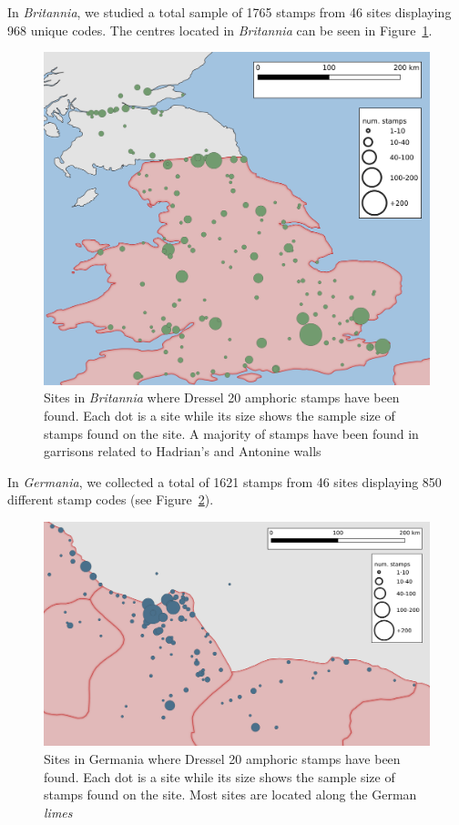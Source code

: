 In \textit{Britannia}, we studied a total sample of 1765 stamps from 46 sites displaying 968 unique codes. The centres located in \textit{Britannia} can be seen in Figure~\ref{britannia}.
 
\begin{figure}[htp]
	\centering
\includegraphics[width=\linewidth]{britannia}
\caption{Sites in \textit{Britannia} where Dressel 20 amphoric stamps have been found. Each dot is a site while its size shows the sample size of stamps found on the site. A majority of stamps have been found in garrisons related to Hadrian's and Antonine walls}
\label{britannia}
\end{figure} 

In \textit{Germania}, we collected a total of 1621 stamps from 46 sites displaying 850 different stamp codes (see Figure~\ref{germania}). 


\begin{figure}[htp]
	\centering
\includegraphics[width=\linewidth]{germania}
\caption{Sites in Germania where Dressel 20 amphoric stamps have been found. Each dot is a site while its size shows the sample size of stamps found on the site. Most sites are located along the German \textit{limes}}
\label{germania}
\end{figure}

